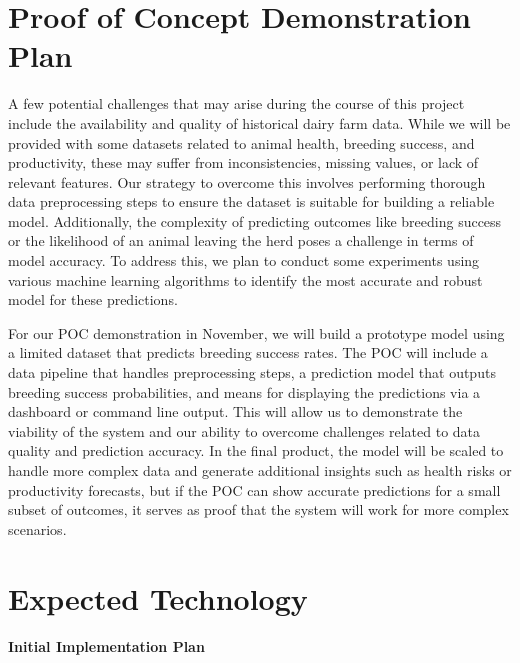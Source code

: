 \documentclass{article}
\begin{document}
\section{Proof of Concept Demonstration Plan}

A few potential challenges that may arise during the course of this project include the availability and quality of historical dairy farm data. While we will be provided with some datasets related to animal health, breeding success, and productivity, these may suffer from inconsistencies, missing values, or lack of relevant features. Our strategy to overcome this involves performing thorough data preprocessing steps to ensure the dataset is suitable for building a reliable model. Additionally, the complexity of predicting outcomes like breeding success or the likelihood of an animal leaving the herd poses a challenge in terms of model accuracy. To address this, we plan to conduct some experiments using various machine learning algorithms to identify the most accurate and robust model for these predictions.

For our POC demonstration in November, we will build a prototype model using a limited dataset that predicts breeding success rates. The POC will include a data pipeline that handles preprocessing steps, a prediction model that outputs breeding success probabilities, and means for displaying the predictions via a dashboard or command line output. This will allow us to demonstrate the viability of the system and our ability to overcome challenges related to data quality and prediction accuracy. In the final product, the model will be scaled to handle more complex data and generate additional insights such as health risks or productivity forecasts, but if the POC can show accurate predictions for a small subset of outcomes, it serves as proof that the system will work for more complex scenarios.

\section{Expected Technology}
\textbf{Initial Implementation Plan}
\end{document}
